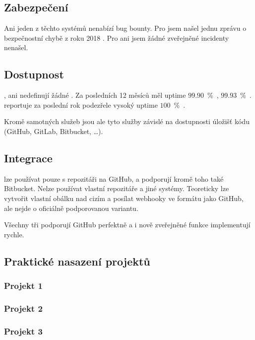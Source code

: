     \subsection{Zabezpečení}
        Ani jeden z těchto  \CI systémů nenabízí bug bounty. Pro \travis jsem našel jednu zprávu o bezpečnostní chybě z roku 2018 \cite{travis-db-drop}. Pro \circleci ani \semaphore jsem žádné zveřejněné incidenty nenašel.

    \subsection{Dostupnost}
        \circleci, \travis ani \semaphore nedefinují žádné . Za posledních 12 měsíců měl \circleci uptime $99.90$~\%~\cite{circle-uptime}, \travis $99.93$~\%~\cite{travis-uptime}. \semaphore reportuje za poslední rok podezřele vysoký uptime $100$~\%~\cite{semaphore-uptime}.

        Kromě samotných \CI služeb jsou ale tyto služby závislé na dostupnosti úložišť kódu (GitHub, GitLab, Bitbucket, …).

    \subsection{Integrace}
        \travis lze používat pouze s repozitáři na GitHub, \circleci a \semaphore podporují kromě toho také Bitbucket. Nelze používat vlastní repozitáře a jiné systémy. Teoreticky lze vytvořit vlastní obálku nad cizím  a posílat webhooky ve formátu jako GitHub, ale nejde o oficiálně podporovanou variantu.

        Všechny tři \CI podporují GitHub perfektně a i nově zveřejněné funkce implementují rychle.

    \subsection{Praktické nasazení projektů}
        \subsubsection{Projekt 1}
            \blind[2]

        \subsubsection{Projekt 2}
            \blind[2]

        \subsubsection{Projekt 3}
            \blind[2]
